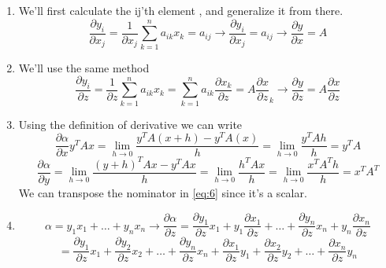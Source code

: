\documentclass{article}
\begin{document}
\subsection{}
\begin{enumerate}[label=(\roman*)]
\item
We'll first calculate the ij'th element , and generalize it from there.
\begin{equation}
    \frac{\partial y_i}{\partial x_j} = \frac{1}{\partial x_j} \sum_{k = 1}^{n} a_{ik}x_{k} = a_{ij} \rightarrow \frac{\partial y_i}{\partial x_j} = a_{ij} \rightarrow \frac{\partial y}{\partial x} = A
\end{equation}
\item
We'll use the same method
\begin{equation}
    \frac{\partial y_i}{\partial z} = \frac{1}{\partial z} \sum_{k = 1}^{n} a_{ik}x_k = \sum_{k = 1}^{n} a_{ik} \frac{\partial x_k}{\partial z} = A \frac{\partial x}{\partial z}_k \rightarrow \frac{\partial y}{\partial z} = A \frac{\partial x}{\partial z}
\end{equation}
\item
Using the definition of derivative we can write
\begin{equation}
    \frac{\partial \alpha}{\partial x} y^{T}Ax = \lim_{h \to 0} \frac{y^{T}A(x + h) - y^{T}A(x)}{h} = \lim_{h \to 0} \frac{y^{T}Ah}{h} = y^{T}A
\end{equation}
\begin{equation}
    \frac{\partial \alpha}{\partial y} = \lim_{h \to 0} \frac{(y+h)^T A x - y^T A x}{h} = \lim_{h \to 0} \frac{h^T A x}{h} = \lim_{h \to 0} \frac{x^T A^T h}{h} = x^T A^T  \label{eq:6}
\end{equation}
We can transpose the nominator in \eqref{eq:6} since it's a scalar.
\item
\begin{equation}
    \alpha = y_1 x_1 + \dots + y_n x_n \rightarrow \frac{\partial \alpha}{\partial z} = \frac{\partial y_1}{\partial z} x_1 + y_1 \frac{\partial x_1}{\partial z} + \dots + \frac{\partial y_n}{\partial z} x_n + y_n \frac{\partial x_n}{\partial z}
\end{equation}
\begin{equation}
    = \frac{\partial y_1}{\partial z} x_1 + \frac{\partial y_2}{\partial z} x_2 + \dots + \frac{\partial y_n}{\partial z} x_n + \frac{\partial x_1}{\partial z} y_1 + \frac{\partial x_2}{\partial z} y_2 + \dots + \frac{\partial x_n}{\partial z} y_n
\end{equation}
\begin{equation}

\end{equation}
\end{enumerate}
\end{document}
